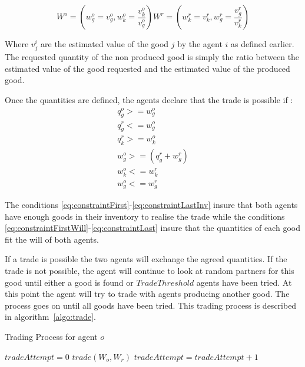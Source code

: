 \documentclass{wscpaperproc}
\begin{document}
\begin{equation}
	 W^o=(w_g^o = v_g^o,w_k^o= \frac{v_k^o}{v_g^o}) 
	 W^r=(w_k^r = v_k^r,w_g^r= \frac{v_g^r}{v_k^r}) 
	 \label{eq:trade}
\end{equation}

 Where $v_j^i$ are the estimated value of the good $j$ by the agent $i$ as defined earlier. 
The requested quantity of the non produced good is simply the ratio between the estimated value of the good requested and the estimated value of the produced good.


Once the quantities are defined, the agents declare that the trade is possible if :
\begin{align}
q_g^o >= w_g^o \label{eq:constraintFirst}\\
q_g^r <= w_g^o \\
q_k^r >= w_k^o \label{eq:constraintLastInv}\\
w_g^o>=(q_g^r+w_g^r)\label{eq:constraintFirstWill} \\
w_k^o<=w_k^r \\
w_g^o<=w_g^r
\label{eq:constraintLast}
\end{align}


The conditions \ref{eq:constraintFirst}-\ref{eq:constraintLastInv} insure that both agents have enough goods in their inventory to realise the trade while the conditions \ref{eq:constraintFirstWill}-\ref{eq:constraintLast} insure that the quantities of each good fit the will of both agents.



If a trade is possible the two agents will exchange the agreed quantities. If the trade is not possible, the agent will continue to look at random partners for this good until either a good is found or $TradeThreshold$ agents have been tried. At this point the agent will try to trade with agents producing another good. The process goes on until all goods have been tried. This trading process is described in algorithm~\ref{algo:trade}.

\begin{algorithm}
\caption{Trading Process for agent $o$}
\label{algo:trade}
	\begin{algorithmic}[1]
	\scriptsize
			\State $tradeAttempt = 0$
					\State $trade(W_o,W_r)$
				\Else
					\State $tradeAttempt = tradeAttempt + 1$					
				\EndIf
			\EndFor
		\EndFor
\end{algorithmic}
\end{algorithm}
\end{document}
